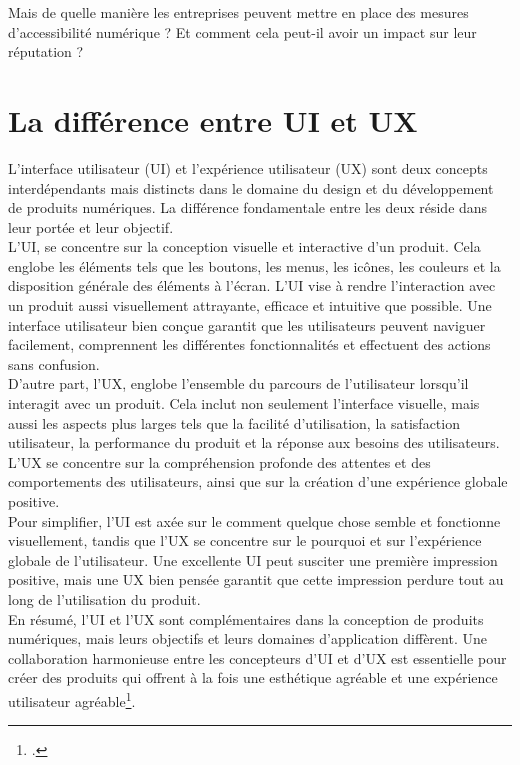 \documentclass[12pt, a4paper]{report}
\begin{document}
Mais de quelle manière les entreprises peuvent mettre en place des mesures d'accessibilité numérique ? Et comment cela peut-il avoir un impact sur leur réputation ?

\section{La différence entre UI et UX}

L'interface utilisateur (UI) et l'expérience utilisateur (UX) sont deux concepts interdépendants mais distincts dans le domaine du design et du développement de produits numériques. La différence fondamentale entre les deux réside dans leur portée et leur objectif.\\

L'UI, se concentre sur la conception visuelle et interactive d'un produit. Cela englobe les éléments tels que les boutons, les menus, les icônes, les couleurs et la disposition générale des éléments à l'écran. L'UI vise à rendre l'interaction avec un produit aussi visuellement attrayante, efficace et intuitive que possible. Une interface utilisateur bien conçue garantit que les utilisateurs peuvent naviguer facilement, comprennent les différentes fonctionnalités et effectuent des actions sans confusion.\\

D'autre part, l'UX, englobe l'ensemble du parcours de l'utilisateur lorsqu'il interagit avec un produit. Cela inclut non seulement l'interface visuelle, mais aussi les aspects plus larges tels que la facilité d'utilisation, la satisfaction utilisateur, la performance du produit et la réponse aux besoins des utilisateurs. L'UX se concentre sur la compréhension profonde des attentes et des comportements des utilisateurs, ainsi que sur la création d'une expérience globale positive.\\

Pour simplifier, l'UI est axée sur le comment quelque chose semble et fonctionne visuellement, tandis que l'UX se concentre sur le pourquoi et sur l'expérience globale de l'utilisateur. Une excellente UI peut susciter une première impression positive, mais une UX bien pensée garantit que cette impression perdure tout au long de l'utilisation du produit.\\

En résumé, l'UI et l'UX sont complémentaires dans la conception de produits numériques, mais leurs objectifs et leurs domaines d'application diffèrent. Une collaboration harmonieuse entre les concepteurs d'UI et d'UX est essentielle pour créer des produits qui offrent à la fois une esthétique agréable et une expérience utilisateur agréable\footcite{ardito_investigating_2014}.
\end{document}
